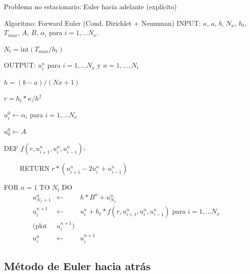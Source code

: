 \documentclass{beamer}
\begin{document}
\begin{frame}{Problema no estacionario: Euler hacia adelante (expl\'icito)}

\begin{footnotesize}

\begin{block}{Algoritmo: Forward Euler (Cond. Dirichlet + Neumman)}
INPUT: $\kappa$, $a$, $b$, $N_x$, $h_t$, $T_{max}$, $A$, $B$, $\alpha_i$ para $i=1,\dots N_x$.

$N_t = \text{int}(T_{max} / h_t)$

OUTPUT: $u_i^n$ para $i=1,\dots N_x$ y $ n = 1, \dots, N_t$

\strut
$h = (b-a) / (Nx+1)$

$r = h_t * \kappa / h^2$

$u_{i}^{0} \leftarrow \alpha_{i}$ para $i=1,\dots N_x$

$u_0^{0} \leftarrow A$

\strut

DEF $f(r, u_{i+1}^{n}, u_{i}^{n}, u_{i-1}^{n}) : $

$\qquad$ RETURN $r * \left(u_{i+1}^{n} - 2 u_{i}^{n} + u_{i-1}^{n}\right)$

\strut

FOR $ n = 1$ TO $N_t$ DO
\begin{eqnarray*}
u_{N_x+1}^n & \leftarrow & h * B^n + u_{N_x}^n \\
u_{i}^{n+1} & \leftarrow & u_{i}^{n} + h_t * f(r, u_{i+1}^{n}, u_{i}^{n}, u_{i-1}^{n}) \text{ para } 
i=1,\dots N_x \\
(\text{plot} & u_i^{n+1}) \\
u_{i}^{n} & \leftarrow & u_{i}^{n+1}
\end{eqnarray*}
\end{block}
\end{footnotesize}

\end{frame}

\subsection{Método de Euler hacia atrás}

\begin{frame}
\begin{center}
\end{center}
\end{frame}
\end{document}

